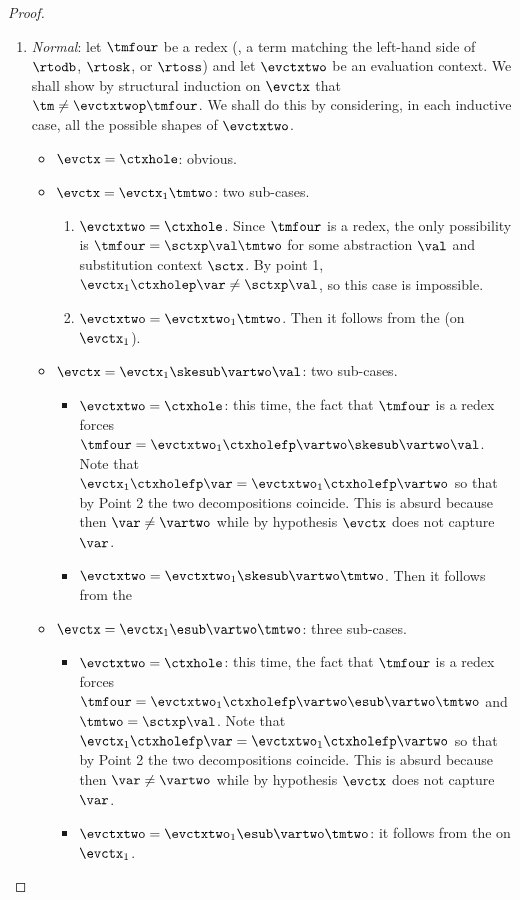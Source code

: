 \begin{proof}
\begin{enumerate}
\item \emph{Normal}:  let $\tmfour$ be a redex (\ie, a term matching the left-hand side of $\rtodb$, $\rtosk$, or $\rtoss$) and let $\evctxtwo$ be an evaluation context. We shall show by structural induction on $\evctx$ that $\tm\neq\evctxtwop\tmfour$. We shall do this by considering, in each inductive case, all the possible shapes of $\evctxtwo$.
	\begin{itemize}
		\item $\evctx=\ctxhole$: obvious.
		\item $\evctx=\evctx_1\tmtwo$: two sub-cases.
		\begin{enumerate}
			\item  $\evctxtwo=\ctxhole$. Since $\tmfour$ is a redex, the only possibility is $\tmfour=\sctxp\val\tmtwo$ for some abstraction $\val$ and substitution context $\sctx$. By point 1, $\evctx_1\ctxholep\var\neq\sctxp\val$, so this case is impossible.
			\item  $\evctxtwo=\evctxtwo_1\tmtwo$. Then it follows from the \ih (on $\evctx_1$). 
		\end{enumerate}
		\item $\evctx=\evctx_1\skesub\vartwo\val$: two sub-cases.
		\begin{itemize}
			\item $\evctxtwo=\ctxhole$:  this time, the fact that $\tmfour$ is a redex forces $\tmfour=\evctxtwo_1\ctxholefp\vartwo\skesub\vartwo\val$. Note that $\evctx_1\ctxholefp\var=\evctxtwo_1\ctxholefp\vartwo $ so that by Point 2 the two decompositions coincide. This is absurd because then $\var\neq\vartwo$ while by hypothesis $\evctx$ does not capture $\var$.
			\item $\evctxtwo=\evctxtwo_1\skesub\vartwo\tmtwo$. Then it follows from the \ih
		\end{itemize}
		\item $\evctx=\evctx_1\esub\vartwo\tmtwo$: three sub-cases.
		\begin{itemize}
			\item $\evctxtwo=\ctxhole$: this time, the fact that $\tmfour$ is a redex forces $\tmfour=\evctxtwo_1\ctxholefp\vartwo\esub\vartwo\tmtwo$ and $\tmtwo=\sctxp\val$. Note that $\evctx_1\ctxholefp\var=\evctxtwo_1\ctxholefp\vartwo $ so that by Point 2 the two decompositions coincide. This is absurd because then $\var\neq\vartwo$ while by hypothesis $\evctx$ does not capture $\var$.
			\item $\evctxtwo=\evctxtwo_1\esub\vartwo\tmtwo$: it follows from the \ih on $\evctx_1$.

\end{itemize}
\end{itemize}
\end{enumerate}
\end{proof}
